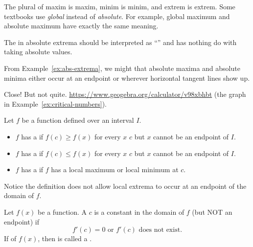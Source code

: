\documentclass[../main.tex]{subfiles}
\begin{document}
  The plural of maxim is maxim, minim is minim, and extrem is extrem.  Some textbooks use \emph{global} instead of \emph{absolute}. For example, global maximum and absolute maximum have exactly the same meaning.

  \faExclamationTriangle{} The  in absolute extrema should be interpreted as ``'' and has nothing do with taking absolute values.
  \clearpage

  From Example~\ref{ex:abs-extrema}, we might  that absolute maxima and absolute minima either occur at an endpoint or wherever horizontal tangent lines show up.

  Close! But not quite. \url{https://www.geogebra.org/calculator/v98xbhbt} (the graph in Example~\ref{ex:critical-numbers}).

  \begin{mdframed}[style=withref-compact]
    Let \(f\) be a function defined over an interval \(I\).

    \begin{itemize}[noitemsep]
      \item \(f\) has a  if \(f(c) \ge f(x)\) for every \(x\)  \(c\) but \(x\) cannot be an endpoint of \(I\).
      \item \(f\) has a  if \(f(c) \le f(x)\) for every \(x\)  \(c\) but \(x\) cannot be an endpoint of \(I\).
      \item \(f\) has a  if \(f\) has a local maximum or local minimum at \(c\).
    \end{itemize}

  \end{mdframed}
  \faExclamationTriangle{} Notice the definition does not allow local extrema to occur at an endpoint of the domain of \(f\).

  \begin{mdframed}[style=withref-compact]
    Let \(f(x)\) be a function. A  \(c\) is a constant in the domain of \(f\) (but NOT an endpoint) if 
    \[
      f'(c) = 0 \text{ or } f'(c) \text{ does not exist}.
    \]
    If  of \(f(x)\), then  is called a .

  \end{mdframed}
\end{document}
